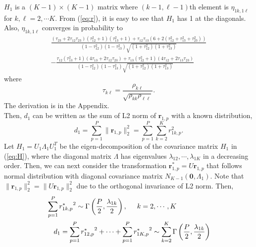 \documentclass[aoas,preprint]{imsart}
\numberwithin{equation}{section}
\theoremstyle{plain}
\begin{document}
$H_1$ is a $(K-1) \times (K-1)$ matrix where $(k-1, \ell-1)$th element is $\eta_{1k, 1\ell}$ for $k, \ell = 2, \cdots K$. From (\ref{eq:r}), it is easy to see that $H_1$ has 1 at the diagonals. Also, $\eta_{1k, 1\ell}$ converges in probability to
\begin{equation} \begin{multlined}
\frac{(\tau_{23}+2\tau_{12}\tau_{23})(\tau_{12}^2+1)(\tau_{13}^2+1) + \tau_{12}\tau_{13}(6+2(\tau_{12}^2+\tau_{13}^2+\tau_{23}^2))}{(1-{\tau}_{12}^2)(1-{\tau}_{13}^2)\sqrt{(1+{\tau}_{12}^2)(1+{\tau}_{13}^2)}} \\
- \frac{\tau_{12}(\tau_{13}^2+1)(4\tau_{13}+2\tau_{12}\tau_{23}) + \tau_{13}(\tau_{12}^2+1)(4\tau_{12}+2\tau_{13}\tau_{23})}{(1-{\tau}_{12}^2)(1-{\tau}_{13}^2)\sqrt{(1+{\tau}_{12}^2)(1+{\tau}_{13}^2)}}
\label{eq:eta}
\end{multlined} \end{equation}
where 
$${\tau}_{k\ell}= \frac{\rho_{k\ell}}{\sqrt{{\rho}_{kk}{\rho}_{\ell\ell}}}. $$
The derivation is in the Appendix. \\

Then, $d_1$ can be written as the sum of L2 norm of $\bm{r}_{1,p}$ with a known distribution, 
\begin{equation}
d_1 = \sum_{p=1}^{P} \|\bm{r}_{1,p}\|_2^2 = \sum_{p=1}^{P} \sum_{k=2}^K r_{1k,p}^2.
\label{eq:d2}
\end{equation}
Let $H_1 = U_1 \Lambda_1 U_1^T$ be the eigen-decomposition of the covariance matrix $H_1$ in (\ref{eq:H}), where the diagonal matrix $\Lambda$ has eigenvalues $\lambda_{12}, \cdots, \lambda_{1K}$ in a decreasing order. Then, we can next consider the transformation $\bm{r}_{1,p}^* = U\bm{r}_{1,p}$ that follows normal distribution with diagonal covariance matrix $N_{K-1}(\bm{0}, \Lambda_1)$. Note that $\|\bm{r}_{1,p}\|_2^2 = \|U\bm{r}_{1,p}\|_2^2$ due to the orthogonal invariance of L2 norm. Then,
\begin{equation}
    \begin{multlined}
    \sum_{p=1}^{P} {r_{1k,p}^*}^2 \sim \Gamma \left( \frac{P}{2}, \frac{\lambda_{1k}}{2} \right), \hspace{5mm} k = 2, \cdots, K\\
    d_1 =  \sum_{p=1}^{P} {r_{12,p}^*}^2 + \cdots +\sum_{p=1}^P{r_{1K,p}^*}^2 \sim \sum_{k=2}^{K} \Gamma \left( \frac{P}{2}, \frac{\lambda_{1k}}{2}\right)
    \end{multlined}
    \label{eq:d_dist}
\end{equation}
\end{document}
